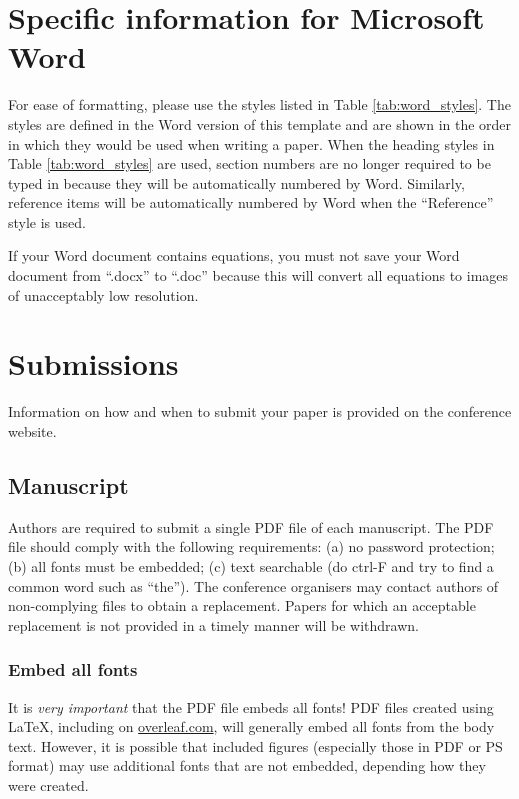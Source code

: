 \documentclass{Interspeech2024}
\begin{document}
\section{Specific information for Microsoft Word}

For ease of formatting, please use the styles listed in Table \ref{tab:word_styles}. The styles are defined in the Word version of this template and are shown in the order in which they would be used when writing a paper. When the heading styles in Table \ref{tab:word_styles} are used, section numbers are no longer required to be typed in because they will be automatically numbered by Word. Similarly, reference items will be automatically numbered by Word when the ``Reference'' style is used.

If your Word document contains equations, you must not save your Word document from ``.docx'' to ``.doc'' because this will convert all equations to images of unacceptably low resolution.

\section{Submissions}

Information on how and when to submit your paper is provided on the conference website.

\subsection{Manuscript}

Authors are required to submit a single PDF file of each manuscript. The PDF file should comply with the following requirements: (a) no password protection; (b) all fonts must be embedded; (c) text searchable (do ctrl-F and try to find a common word such as ``the''). The conference organisers may contact authors of non-complying files to obtain a replacement. Papers for which an acceptable replacement is not provided in a timely manner will be withdrawn.

\subsubsection{Embed all fonts}

It is \textit{very important} that the PDF file embeds all fonts!  PDF files created using \LaTeX, including on \url{overleaf.com}, will generally embed all fonts from the body text. However, it is possible that included figures (especially those in PDF or PS format) may use additional fonts that are not embedded, depending how they were created. 
\end{document}
